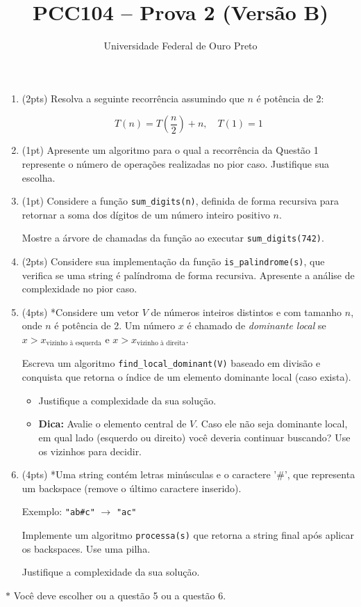\documentclass[12pt]{article}
\title{PCC104 – Prova 2 (Versão B)}
\author{Universidade Federal de Ouro Preto}
\date{}
\begin{document}
\maketitle

\begin{enumerate}

\item (2pts) Resolva a seguinte recorrência assumindo que $n$ é potência de 2:

\[
T(n) = T\left(\frac{n}{2}\right) + n,\quad T(1) = 1
\]

\item (1pt) Apresente um algoritmo para o qual a recorrência da Questão 1 represente o número de operações realizadas no pior caso. Justifique sua escolha.

\item (1pt) Considere a função \texttt{sum\_digits(n)}, definida de forma recursiva para retornar a soma dos dígitos de um número inteiro positivo $n$. 

Mostre a árvore de chamadas da função ao executar \texttt{sum\_digits(742)}. 

\item (2pts) Considere sua implementação da função \texttt{is\_palindrome(s)}, que verifica se uma string é palíndroma de forma recursiva. Apresente a análise de complexidade no pior caso.

\item (4pts) *Considere um vetor $V$ de números inteiros distintos e com tamanho $n$, onde $n$ é potência de 2. Um número $x$ é chamado de \textit{dominante local} se $x > x_{\text{vizinho à esquerda}}$ e $x > x_{\text{vizinho à direita}}$.

Escreva um algoritmo \texttt{find\_local\_dominant(V)} baseado em divisão e conquista que retorna o índice de um elemento dominante local (caso exista).

\begin{itemize}
  \item Justifique a complexidade da sua solução.
  \item \textbf{Dica:} Avalie o elemento central de $V$. Caso ele não seja dominante local, em qual lado (esquerdo ou direito) você deveria continuar buscando? Use os vizinhos para decidir.
\end{itemize}


\item (4pts) *Uma string contém letras minúsculas e o caractere '\#', que representa um backspace (remove o último caractere inserido).

Exemplo: \texttt{"ab\#c"} $\rightarrow$ \texttt{"ac"}

Implemente um algoritmo \texttt{processa(s)} que retorna a string final após aplicar os backspaces. Use uma pilha.

Justifique a complexidade da sua solução.

\end{enumerate}

$*$ Você deve escolher ou a questão 5 ou a questão 6.
\end{document}
